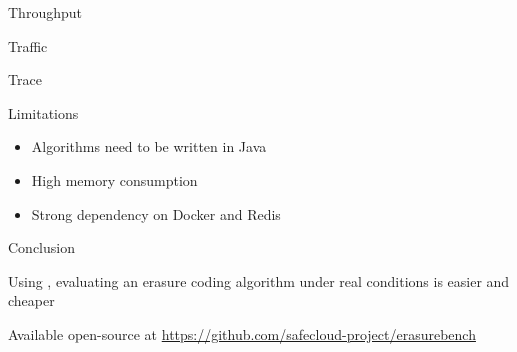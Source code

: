 \begin{frame}{Throughput}
    \begin{figure}
        
    \end{figure}
\end{frame}

\begin{frame}{Traffic}
    \begin{figure}
        
    \end{figure}
\end{frame}

\begin{frame}{Trace}
    \begin{figure}
        
    \end{figure}
\end{frame}

\subtitle[Conclusion]{Conclusion}

\begin{frame}{Limitations}
    \begin{itemize}
        \item Algorithms need to be written in Java
        \item High memory consumption
        \item Strong dependency on Docker and Redis
    \end{itemize}
\end{frame}

\begin{frame}{Conclusion}

  \begin{snugshade}
    Using \sys, evaluating an erasure coding algorithm under real conditions is easier and cheaper
  \end{snugshade}
  
  
  
  \begin{snugshade}
    Available open-source at \url{https://github.com/safecloud-project/erasurebench}    
  \end{snugshade}

\end{frame}




